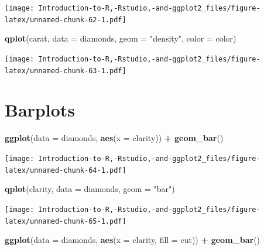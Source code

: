 \documentclass[]{book}
\newenvironment{Shaded}{\begin{snugshade}}{\end{snugshade}}
\newcommand{\DataTypeTok}[1]{\textcolor[rgb]{0.13,0.29,0.53}{#1}}
\newcommand{\KeywordTok}[1]{\textcolor[rgb]{0.13,0.29,0.53}{\textbf{#1}}}
\newcommand{\NormalTok}[1]{#1}
\newcommand{\OperatorTok}[1]{\textcolor[rgb]{0.81,0.36,0.00}{\textbf{#1}}}
\newcommand{\StringTok}[1]{\textcolor[rgb]{0.31,0.60,0.02}{#1}}
\begin{document}
\texttt{[image: Introduction-to-R,-Rstudio,-and-ggplot2\_files/figure-latex/unnamed-chunk-62-1.pdf]}

\begin{Shaded}
\begin{Highlighting}[]
\KeywordTok{qplot}\NormalTok{(carat, }\DataTypeTok{data =}\NormalTok{ diamonds, }\DataTypeTok{geom =} \StringTok{"density"}\NormalTok{, }\DataTypeTok{color =}\NormalTok{ color)}
\end{Highlighting}
\end{Shaded}

\texttt{[image: Introduction-to-R,-Rstudio,-and-ggplot2\_files/figure-latex/unnamed-chunk-63-1.pdf]}

\hypertarget{barplots}{%
\section{Barplots}\label{barplots}}

\begin{Shaded}
\begin{Highlighting}[]
\KeywordTok{ggplot}\NormalTok{(}\DataTypeTok{data =}\NormalTok{ diamonds, }\KeywordTok{aes}\NormalTok{(}\DataTypeTok{x =}\NormalTok{ clarity)) }\OperatorTok{+}\StringTok{ }\KeywordTok{geom_bar}\NormalTok{() }
\end{Highlighting}
\end{Shaded}

\texttt{[image: Introduction-to-R,-Rstudio,-and-ggplot2\_files/figure-latex/unnamed-chunk-64-1.pdf]}

\begin{Shaded}
\begin{Highlighting}[]
\KeywordTok{qplot}\NormalTok{(clarity, }\DataTypeTok{data =}\NormalTok{ diamonds, }\DataTypeTok{geom =} \StringTok{"bar"}\NormalTok{)}
\end{Highlighting}
\end{Shaded}

\texttt{[image: Introduction-to-R,-Rstudio,-and-ggplot2\_files/figure-latex/unnamed-chunk-65-1.pdf]}

\begin{Shaded}
\begin{Highlighting}[]
\KeywordTok{ggplot}\NormalTok{(}\DataTypeTok{data =}\NormalTok{ diamonds, }\KeywordTok{aes}\NormalTok{(}\DataTypeTok{x =}\NormalTok{ clarity, }\DataTypeTok{fill =}\NormalTok{ cut)) }\OperatorTok{+}\StringTok{ }\KeywordTok{geom_bar}\NormalTok{() }
\end{Highlighting}
\end{Shaded}
\end{document}
